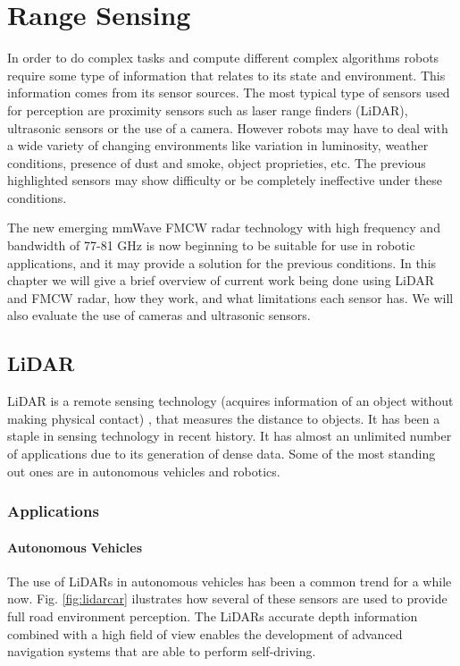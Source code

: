 \chapter{Range Sensing} \label{ch:Concepts}

In order to do complex tasks and compute different complex algorithms robots require some type of information that relates to its state and environment. This information comes from its sensor sources.
The most typical type of sensors used for perception are proximity sensors such as laser range finders (\ac{LiDAR}), ultrasonic sensors or the use of a camera. However robots may have to deal with a wide variety of changing environments like variation in luminosity, weather conditions, presence of dust and smoke, object proprieties, etc. The previous highlighted sensors may show difficulty or be completely ineffective under these conditions.

The new emerging \ac{mmWave} \ac{FMCW} radar technology with high frequency and bandwidth of 77-81 GHz is now beginning to be suitable for use in robotic applications, and it may provide a solution for the previous conditions. In this chapter we will give a brief overview of current work being done using \ac{LiDAR} and \ac{FMCW} \ac{radar}, how they work, and what limitations each sensor has. We will also evaluate the use of cameras and ultrasonic sensors.

\section{LiDAR}
\ac{LiDAR} is a remote sensing technology (acquires information of an object without making physical contact) , that measures the distance to objects. It has been a staple in sensing technology in recent history. It has almost an  unlimited  number of applications \cite{lidar100uses} due to its generation of dense data. Some of the most standing out ones are in autonomous vehicles and robotics.
\subsection{Applications}

\subsubsection{Autonomous Vehicles}
The use of \ac{LiDAR}s in autonomous vehicles has been a common trend for a while now. Fig. \ref{fig:lidarcar} ilustrates how several of these sensors are used to provide full road environment perception. The \ac{LiDAR}s accurate depth information combined with a high field of view enables the development of advanced navigation systems that are able to perform self-driving.
 
